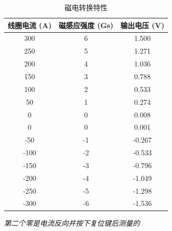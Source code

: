 \documentclass[11pt]{ctexart}
\makeatletter
\newcommand{\boxspacing}{\kern\kvtcb@left@rule\kern\kvtcb@boxsep}
\newcommand{\prompt}[4]{
        {\ttfamily\llap{{\color{#2}[#3]:\hspace{3pt}#4}}\vspace{-\baselineskip}}
    }
\makeatother
\begin{document}
            \begin{tcolorbox}[breakable, size=fbox, boxrule=.5pt, pad at break*=1mm, opacityfill=0]
\prompt{Out}{outcolor}{25}{\boxspacing}
\begin{table}[H]
\centering
\caption{磁电转换特性}
\label{tab:magnetic}
\begin{tabular}{c c c}
\toprule
线圈电流 (A) & 磁感应强度 (Gs) & 输出电压 (V) \\
\midrule
300 & 6 & 1.500 \\
250 & 5 & 1.271 \\
200 & 4 & 1.036 \\
150 & 3 & 0.788 \\
100 & 2 & 0.533 \\
50  & 1 & 0.274 \\
0   & 0 & 0.008 \\
0   & 0 & 0.001 \\
-50 & -1 & -0.267 \\
-100 & -2 & -0.533 \\
-150 & -3 & -0.796 \\
-200 & -4 & -1.049 \\
-250 & -5 & -1.298 \\
-300 & -6 & -1.536 \\
\bottomrule
\end{tabular}
\end{table}
\end{tcolorbox}
        
    \emph{第二个零是电流反向并按下复位键后测量的}
\end{document}
